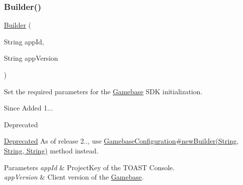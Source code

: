 \mbox{\label{classcom_1_1toast_1_1android_1_1gamebase_1_1_gamebase_configuration_1_1_builder_afbe6729f6423577d9a06c1832315f37d}} 
\subsubsection{\texorpdfstring{Builder()}{Builder()}\hspace{0.1cm}{\footnotesize\ttfamily [2/2]}}
{\footnotesize\ttfamily \hyperlink{classcom_1_1toast_1_1android_1_1gamebase_1_1_gamebase_configuration_1_1_builder}{Builder} (\begin{DoxyParamCaption}\item[{String}]{app\+Id,  }\item[{String}]{app\+Version }\end{DoxyParamCaption})}



Set the required parameters for the \hyperlink{classcom_1_1toast_1_1android_1_1gamebase_1_1_gamebase}{Gamebase} S\+DK initialization. 

\begin{DoxySince}{Since}
Added 1... 
\end{DoxySince}
\begin{DoxyRefDesc}{Deprecated}
\item[\hyperlink{deprecated__deprecated000010}{Deprecated}]As of release 2.., use \hyperlink{classcom_1_1toast_1_1android_1_1gamebase_1_1_gamebase_configuration_a7c28786c8e446dd54cb5f4d0797b6564}{Gamebase\+Configuration\#new\+Builder(\+String, String, String)} method instead. \end{DoxyRefDesc}

\begin{DoxyParams}{Parameters}
{\em app\+Id} & Project\+Key of the T\+O\+A\+ST Console. \\
\hline
{\em app\+Version} & Client version of the \hyperlink{classcom_1_1toast_1_1android_1_1gamebase_1_1_gamebase}{Gamebase}. \\
\hline
\end{DoxyParams}


